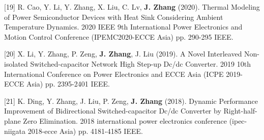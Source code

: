 [19] R. Cao, Y. Li, Y. Zhang, X. Liu, C. Lv, \textbf{J. Zhang} (2020). Thermal Modeling of Power Semiconductor Devices with Heat Sink Considering Ambient Temperature Dynamics. 2020 IEEE 9th International Power Electronics and Motion Control Conference (IPEMC2020-ECCE Asia)   pp. 290-295 IEEE.

[20] X. Li, Y. Zhang, P. Zeng, \textbf{J. Zhang}, J. Liu (2019). A Novel Interleaved Non-isolated Switched-capacitor Network High Step-up Dc/dc Converter. 2019 10th International Conference on Power Electronics and ECCE Asia (ICPE 2019-ECCE Asia)   pp. 2395-2401 IEEE.

[21] K. Ding, Y. Zhang, J. Liu, P. Zeng, \textbf{J. Zhang} (2018). Dynamic Performance Improvement of Bidirectional Switched-capacitor Dc/dc Converter by Right-half-plane Zero Elimination. 2018 international power electronics conference (ipec-niigata 2018-ecce Asia)   pp. 4181-4185 IEEE.